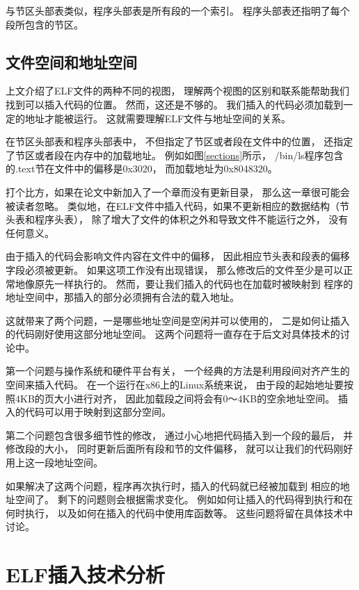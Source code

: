 与节区头部表类似，程序头部表是所有段的一个索引。
程序头部表还指明了每个段所包含的节区。

\subsection{文件空间和地址空间}
\label{twoqs}
上文介绍了ELF文件的两种不同的视图，
理解两个视图的区别和联系能帮助我们找到可以插入代码的位置。
然而，这还是不够的。
我们插入的代码必须加载到一定的地址才能被运行。
这就需要理解ELF文件与地址空间的关系。

在节区头部表和程序头部表中，
不但指定了节区或者段在文件中的位置，
还指定了节区或者段在内存中的加载地址。
例如如图\ref{sections}所示，
/bin/ls程序包含的.text节在文件中的偏移是0x3020，
而加载地址为0x8048320。

打个比方，如果在论文中新加入了一个章而没有更新目录，
那么这一章很可能会被读者忽略。
类似地，在ELF文件中插入代码，如果不更新相应的数据结构（节头表和程序头表），
除了增大了文件的体积之外和导致文件不能运行之外，
没有任何意义。

由于插入的代码会影响文件内容在文件中的偏移，
因此相应节头表和段表的偏移字段必须被更新。
如果这项工作没有出现错误，
那么修改后的文件至少是可以正常地像原先一样执行的。
然而，要让我们插入的代码也在加载时被映射到
程序的地址空间中，那插入的部分必须拥有合法的载入地址。

这就带来了两个问题，一是哪些地址空间是空闲并可以使用的，
二是如何让插入的代码刚好使用这部分地址空间。
这两个问题将一直存在于后文对具体技术的讨论中。

第一个问题与操作系统和硬件平台有关，
一个经典的方法是利用段间对齐产生的空间来插入代码。
在一个运行在x86上的Linux系统来说，
由于段的起始地址要按照4KB的页大小进行对齐，
因此加载段之间将会有0～4KB的空余地址空间。
插入的代码可以用于映射到这部分空间。

第二个问题包含很多细节性的修改，
通过小心地把代码插入到一个段的最后，
并修改段的大小，
同时更新后面所有段和节的文件偏移，
就可以让我们的代码刚好用上这一段地址空间。

如果解决了这两个问题，程序再次执行时，插入的代码就已经被加载到
相应的地址空间了。
剩下的问题则会根据需求变化。
例如如何让插入的代码得到执行和在何时执行，
以及如何在插入的代码中使用库函数等。
这些问题将留在具体技术中讨论。



\section{ELF插入技术分析}


